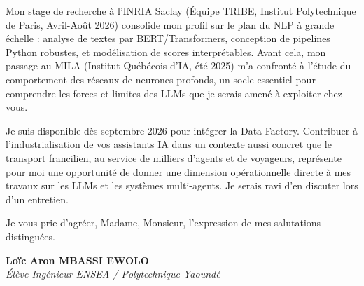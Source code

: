 \documentclass[a4paper,11pt]{article}
\begin{document}
Mon stage de recherche à l'INRIA Saclay (Équipe TRIBE, Institut Polytechnique de Paris, Avril-Août 2026) consolide mon profil sur le plan du NLP à grande échelle : analyse de textes par BERT/Transformers, conception de pipelines Python robustes, et modélisation de scores interprétables. Avant cela, mon passage au MILA (Institut Québécois d'IA, été 2025) m'a confronté à l'étude du comportement des réseaux de neurones profonds, un socle essentiel pour comprendre les forces et limites des LLMs que je serais amené à exploiter chez vous.

Je suis disponible dès septembre 2026 pour intégrer la Data Factory. Contribuer à l'industrialisation de vos assistants IA dans un contexte aussi concret que le transport francilien, au service de milliers d'agents et de voyageurs, représente pour moi une opportunité de donner une dimension opérationnelle directe à mes travaux sur les LLMs et les systèmes multi-agents. Je serais ravi d'en discuter lors d'un entretien.

Je vous prie d'agréer, Madame, Monsieur, l'expression de mes salutations distinguées.

\vspace{0.8cm}

\textbf{Loïc Aron MBASSI EWOLO}\\
\textit{Élève-Ingénieur ENSEA / Polytechnique Yaoundé}
\end{document}
